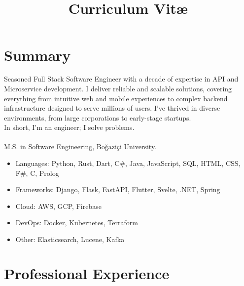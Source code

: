 \documentclass[11pt,a4paper,sans]{moderncv}        %
\title{Curriculum Vit\ae}                               %
\begin{document}
\makecvtitle

\section{Summary}

Seasoned Full Stack Software Engineer with a decade of expertise in API and Microservice development. I deliver reliable and scalable solutions, covering everything from intuitive web and mobile experiences to complex backend infrastructure designed to serve millions of users. I've thrived in diverse environments, from large corporations to early-stage startups.
\\In short, I'm an engineer; I solve problems.
\\\\M.S. in Software Engineering, Boğaziçi University.
\\


\begin{itemize}
\item Languages: Python, Rust, Dart, C\#, Java, JavaScript, SQL, HTML, CSS, F\#, C, Prolog
\item Frameworks: Django, Flask, FastAPI, Flutter, Svelte, .NET, Spring
\item Cloud: AWS, GCP, Firebase
\item DevOps: Docker, Kubernetes, Terraform
\item Other: Elasticsearch, Lucene, Kafka
\end{itemize}

\section{Professional Experience}

\end{document}
